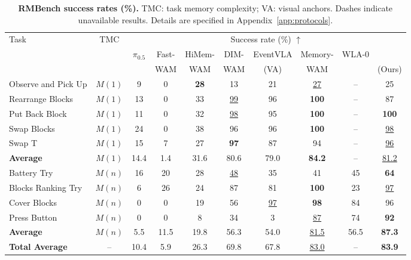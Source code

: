 \begin{table}[t]
\centering
\footnotesize
\setlength{\tabcolsep}{2.5pt}
\renewcommand{\arraystretch}{1.08}
\caption{\textbf{RMBench success rates (\%).} TMC: task memory complexity; VA: visual anchors. Dashes indicate unavailable results. Details are specified in Appendix~\ref{app:protocols}.}
\label{tab:rmbench}
\begin{tabularx}{\linewidth}{@{}Xc*{7}{c}>{\columncolor{blue!7}}c@{}}
\toprule
\multirow[c]{3}{=}{Task} & \multirow[c]{3}{*}{TMC} & \multicolumn{8}{c}{Success rate (\%) $\uparrow$} \\
\cmidrule(lr){3-10}
& & \multirow[c]{2}{*}{$\pi_{0.5}$} & Fast- & HiMem- & DIM- & EventVLA & Memory- & \multirow[c]{2}{*}{WLA-0} & \method{} \\
& & & WAM & WAM & WAM & (VA) & WAM & & (Ours) \\
\midrule
Observe and Pick Up & $M(1)$ & 9 & 0 & \textbf{28} & 13 & 21 & \underline{27} & -- & 25 \\
Rearrange Blocks & $M(1)$ & 13 & 0 & 33 & \underline{99} & 96 & \textbf{100} & -- & 87 \\
Put Back Block & $M(1)$ & 11 & 0 & 32 & \underline{98} & 95 & \textbf{100} & -- & \textbf{100} \\
Swap Blocks & $M(1)$ & 24 & 0 & 38 & 96 & 96 & \textbf{100} & -- & \underline{98} \\
Swap T & $M(1)$ & 15 & 7 & 27 & \textbf{97} & 87 & 94 & -- & \underline{96} \\
\textbf{Average} & $M(1)$ & 14.4 & 1.4 & 31.6 & 80.6 & 79.0 & \textbf{84.2} & -- & \underline{81.2} \\
\midrule
Battery Try & $M(n)$ & 16 & 20 & 28 & \underline{48} & 35 & 41 & 45 & \textbf{64} \\
Blocks Ranking Try & $M(n)$ & 6 & 26 & 24 & 87 & 81 & \textbf{100} & 23 & \underline{97} \\
Cover Blocks & $M(n)$ & 0 & 0 & 19 & 56 & \underline{97} & \textbf{98} & 84 & 96 \\
Press Button & $M(n)$ & 0 & 0 & 8 & 34 & 3 & \underline{87} & 74 & \textbf{92} \\
\textbf{Average} & $M(n)$ & 5.5 & 11.5 & 19.8 & 56.3 & 54.0 & \underline{81.5} & 56.5 & \textbf{87.3} \\
\midrule
\textbf{Total Average} & -- & 10.4 & 5.9 & 26.3 & 69.8 & 67.8 & \underline{83.0} & -- & \textbf{83.9} \\
\bottomrule
\end{tabularx}
\end{table}
